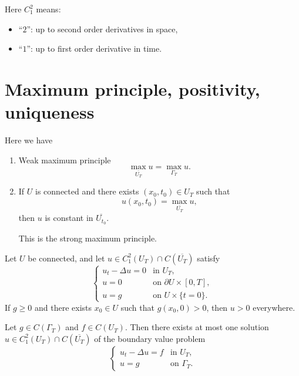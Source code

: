 \begin{remark}
Here $C_1^2$ means:
\begin{itemize}
    \item ``$2$'': up to second order derivatives in space,
    \item ``$1$'': up to first order derivative in time.
\end{itemize}
\end{remark}

\section{Maximum principle, positivity, uniqueness}

\begin{theorem}
Here we have
\begin{enumerate}
    \item
    Weak maximum principle
    $$
    \max_{\overline{U_T}}u=\max_{\Gamma_T}u.
    $$

    \item If $U$ is connected and there exists $(x_0,t_0)\in U_T$ such that
    $$
    u(x_0,t_0)=\max_{\overline{U_T}}u,
    $$
    then $u$ is constant in $\overline{U_{t_0}}$.
    
    This is the strong maximum principle.
\end{enumerate}
\end{theorem}

\begin{theorem}[Positivity]
Let $U$ be connected, and let
$
u\in C_1^2(U_T)\cap C(\overline{U_T})
$
satisfy
$$
\begin{cases}
u_t-\Delta u=0 & \text{in } U_T,\\
u=0 & \text{on } \partial U\times [0,T],\\
u=g & \text{on } U\times \{t=0\}.
\end{cases}
$$
If $g\ge 0$ and there exists $x_0\in U$ such that $g(x_0,0)>0$, then
$
u>0
$
everywhere.
\end{theorem}

\begin{theorem}
Let
$
g\in C(\Gamma_T)
$
and
$
f\in C(U_T).
$
Then there exists at most one solution
$
u\in C_1^2(U_T)\cap C(\overline{U_T})
$
of the boundary value problem
$$
\begin{cases}
u_t-\Delta u=f & \text{in } U_T,\\
u=g & \text{on } \Gamma_T.
\end{cases}
$$
\end{theorem}


